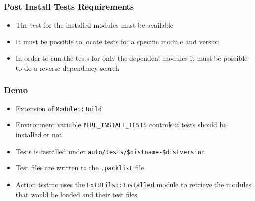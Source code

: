 \documentclass[10pt]{beamer}
\begin{document}
\begin{frame}
\frametitle{Post Install Tests Requirements}
\begin{itemize}
\item The test for the installed modules must be available
\item It must be possible to locate tests for a specific module and version
\item In order to run the tests for only the dependent modules it must be possible to do a reverse dependency search
\end{itemize}
\end{frame}

\begin{frame}[fragile]
\frametitle{Demo}

\begin{itemize}
\item Extension of \verb|Module::Build|
\item Environment variable \verb|PERL_INSTALL_TESTS| controls if tests should be installed or not
\item Tests is installed under \verb|auto/tests/$distname-$distversion|
\item Test files are written to the \verb|.packlist| file
\item Action testinc uses the \verb|ExtUtils::Installed| module to retrieve the modules that would be loaded and their test files
\end{itemize}
\end{frame}
\end{document}
